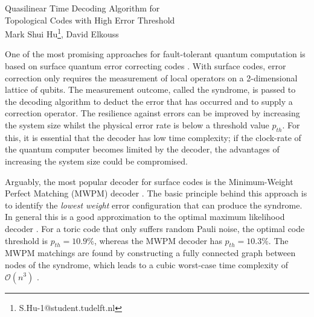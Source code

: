 \documentclass[11pt, a4paper, twoside, titlepage ,dvipsnames]{report}
\begin{document}
\begingroup
    \centering
    \Large Quasilinear Time Decoding Algorithm for \\Topological Codes with High Error Threshold\\[.5em]
    \large Mark Shui Hu\footnote{S.Hu-1@student.tudelft.nl}, David Elkouss\par
\endgroup
\vspace{2em}
One of the most promising approaches for fault-tolerant quantum computation is based on surface quantum error correcting codes \cite{dennis2002topological, kitaev2003fault}. With surface codes, error correction only requires the measurement of local operators on a 2-dimensional lattice of qubits. The measurement outcome, called the syndrome, is passed to the decoding algorithm to deduct the error that has occurred and to supply a correction operator. 
The resilience against errors can be improved by increasing the system size whilst the physical error rate is below a threshold value $p_{th}$. For this, it is essential that the decoder has low time complexity; if the clock-rate of the quantum computer becomes limited by the decoder, the advantages of increasing the system size could be compromised.

Arguably, the most popular decoder for surface codes is the Minimum-Weight Perfect Matching (MWPM) decoder \cite{dennis2002topological}. The basic principle behind this approach is to identify the \emph{lowest weight} error configuration that can produce the syndrome. In general this is a good approximation to the optimal maximum likelihood decoder \cite{bravyi2014efficient}. For a toric code that only suffers random Pauli noise, the optimal code threshold is $p_{th} = 10.9\%$, whereas the MWPM decoder has $p_{th} = 10.3\%$. The MWPM matchings are found by constructing a fully connected graph between nodes of the syndrome, which leads to a cubic worst-case time complexity of $\mathcal{O}(n^3)$ \cite{kolmogorov2009blossom}.
\end{document}
